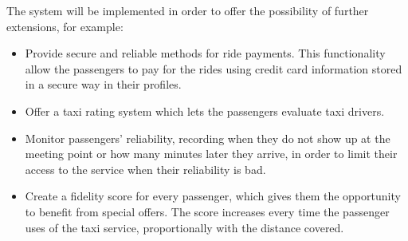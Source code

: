 The system will be implemented in order to offer the possibility of further extensions, for example:

\begin{itemize}
\item Provide secure and reliable methods for ride payments. This functionality allow the passengers to pay for the rides using credit card information stored in a secure way in their profiles.
\item Offer a taxi rating system which lets the passengers evaluate taxi drivers.
\item Monitor passengers' reliability, recording when they do not show up at the meeting point or how many minutes later they arrive, in order to limit their access to the service when their reliability is bad.
\item Create a fidelity score for every passenger, which gives them the opportunity to benefit from special offers. The score increases every time the passenger uses of the taxi service, proportionally with the distance covered. 
\end{itemize}